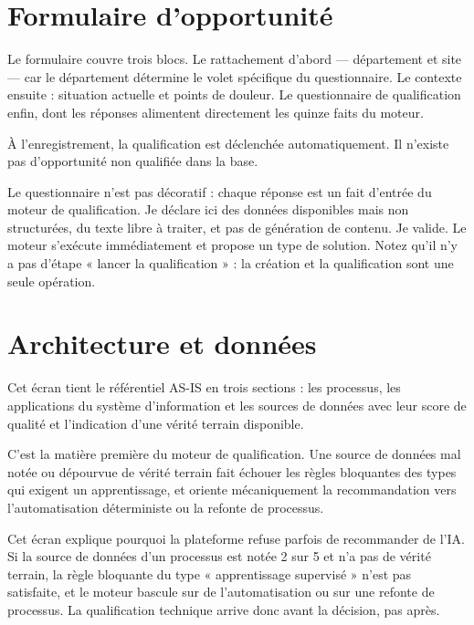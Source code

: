 \section{Formulaire d'opportunité}

Le formulaire couvre trois blocs. Le rattachement d'abord — département et site — car le
département détermine le volet spécifique du questionnaire. Le contexte ensuite :
situation actuelle et points de douleur. Le questionnaire de qualification enfin, dont
les réponses alimentent directement les quinze faits du moteur.

À l'enregistrement, la qualification est déclenchée automatiquement. Il n'existe pas
d'opportunité non qualifiée dans la base.


\begin{oral}
Le questionnaire n'est pas décoratif : chaque réponse est un fait d'entrée du moteur de
qualification. Je déclare ici des données disponibles mais non structurées, du texte
libre à traiter, et pas de génération de contenu. Je valide. Le moteur s'exécute
immédiatement et propose un type de solution. Notez qu'il n'y a pas d'étape « lancer la
qualification » : la création et la qualification sont une seule opération.
\end{oral}

\section{Architecture et données}

Cet écran tient le référentiel AS-IS en trois sections : les processus, les applications
du système d'information et les sources de données avec leur score de qualité et
l'indication d'une vérité terrain disponible.

C'est la matière première du moteur de qualification. Une source de données mal notée ou
dépourvue de vérité terrain fait échouer les règles bloquantes des types qui exigent un
apprentissage, et oriente mécaniquement la recommandation vers l'automatisation
déterministe ou la refonte de processus.


\begin{oral}
Cet écran explique pourquoi la plateforme refuse parfois de recommander de l'IA. Si la
source de données d'un processus est notée 2 sur 5 et n'a pas de vérité terrain, la
règle bloquante du type « apprentissage supervisé » n'est pas satisfaite, et le moteur
bascule sur de l'automatisation ou sur une refonte de processus. La qualification
technique arrive donc avant la décision, pas après.
\end{oral}

